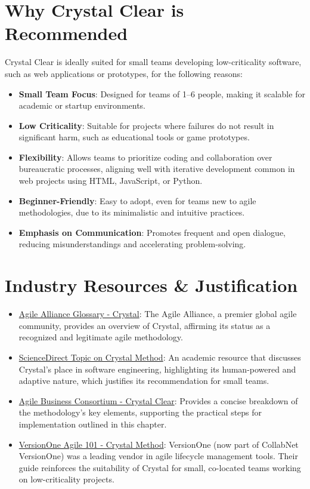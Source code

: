 \section{Why Crystal Clear is Recommended}
Crystal Clear is ideally suited for small teams developing low-criticality software, such as web applications or prototypes, for the following reasons:
\begin{itemize}
    \item \textbf{Small Team Focus}: Designed for teams of 1–6 people, making it scalable for academic or startup environments.
    \item \textbf{Low Criticality}: Suitable for projects where failures do not result in significant harm, such as educational tools or game prototypes.
    \item \textbf{Flexibility}: Allows teams to prioritize coding and collaboration over bureaucratic processes, aligning well with iterative development common in web projects using HTML, JavaScript, or Python.
    \item \textbf{Beginner-Friendly}: Easy to adopt, even for teams new to agile methodologies, due to its minimalistic and intuitive practices.
    \item \textbf{Emphasis on Communication}: Promotes frequent and open dialogue, reducing misunderstandings and accelerating problem-solving.
\end{itemize}

\section{Industry Resources \& Justification}
\begin{itemize}
    \item \href{https://www.agilealliance.org/glossary/crystal/}{Agile Alliance Glossary - Crystal}: The Agile Alliance, a premier global agile community, provides an overview of Crystal, affirming its status as a recognized and legitimate agile methodology.
    \item \href{https://www.sciencedirect.com/topics/computer-science/crystal-method}{ScienceDirect Topic on Crystal Method}: An academic resource that discusses Crystal's place in software engineering, highlighting its human-powered and adaptive nature, which justifies its recommendation for small teams.
\end{itemize}
\begin{itemize}
    \item \href{https://www.agilebusiness.org/resource/crystal-clear-method.html}{Agile Business Consortium - Crystal Clear}: Provides a concise breakdown of the methodology's key elements, supporting the practical steps for implementation outlined in this chapter.
    \item \href{https://www.versionone.com/agile-101/agile-methodologies/crystal-method/}{VersionOne Agile 101 - Crystal Method}: VersionOne (now part of CollabNet VersionOne) was a leading vendor in agile lifecycle management tools. Their guide reinforces the suitability of Crystal for small, co-located teams working on low-criticality projects.
\end{itemize}